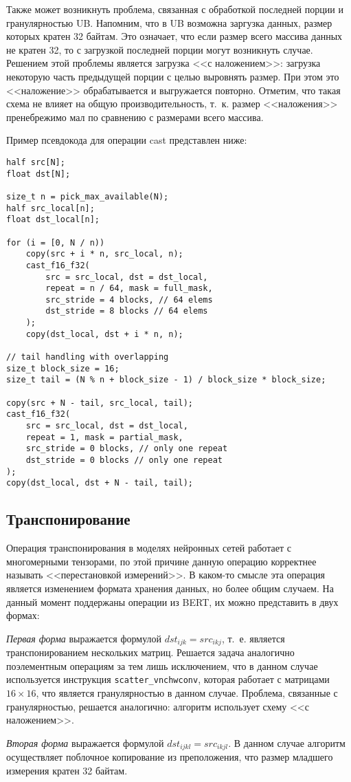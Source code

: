 Также может возникнуть проблема, связанная с обработкой последней порции и
гранулярностью UB. Напомним, что в UB возможна заргузка данных, размер которых
кратен 32 байтам. Это означает, что если размер всего массива данных не кратен
32, то с загрузкой последней порции могут возникнуть случае. Решением этой
проблемы является загрузка <<с наложением>>: загрузка некоторую часть предыдущей
порции с целью выровнять размер. При этом это <<наложение>> обрабатывается и
выгружается повторно. Отметим, что такая схема не влияет на общую
производительность, т.~к. размер <<наложения>> пренебрежимо мал по сравнению
с размерами всего массива.

Пример псевдокода для операции cast представлен ниже:

\begin{lstlisting}
half src[N];
float dst[N];

size_t n = pick_max_available(N);
half src_local[n];
float dst_local[n];

for (i = [0, N / n))
    copy(src + i * n, src_local, n);
    cast_f16_f32(
        src = src_local, dst = dst_local,
        repeat = n / 64, mask = full_mask,
        src_stride = 4 blocks, // 64 elems
        dst_stride = 8 blocks // 64 elems
    );
    copy(dst_local, dst + i * n, n);

// tail handling with overlapping
size_t block_size = 16;
size_t tail = (N % n + block_size - 1) / block_size * block_size;

copy(src + N - tail, src_local, tail);
cast_f16_f32(
    src = src_local, dst = dst_local,
    repeat = 1, mask = partial_mask,
    src_stride = 0 blocks, // only one repeat
    dst_stride = 0 blocks // only one repeat
);
copy(dst_local, dst + N - tail, tail);
\end{lstlisting}

\subsection{Транспонирование}

Операция транспонирования в моделях нейронных сетей работает с многомерными
тензорами, по этой причине данную операцию корректнее называть <<перестановкой
измерений>>. В каком-то смысле эта операция является изменением формата хранения
данных, но более общим случаем. На данный момент поддержаны операции из BERT,
их можно представить в двух формах:

\textit{Первая форма} выражается формулой $dst_{ijk} = src_{ikj}$, т.~е.
является транспонированием нескольких матриц. Решается задача аналогично
поэлементным операциям за тем лишь исключением, что в данном случае используется
инструкция \texttt{scatter\_vnchwconv}, которая работает с матрицами
$16 \times 16$, что является гранулярностью в данном случае. Проблема, связанные
с гранулярностью, решается аналогично: алгоритм использует схему <<с наложением>>.

\textit{Вторая форма} выражается формулой $dst_{ijkl} = src_{ikjl}$. В данном
случае алгоритм осуществляет поблочное копирование из преположения, что размер
младшего измерения кратен 32 байтам.
